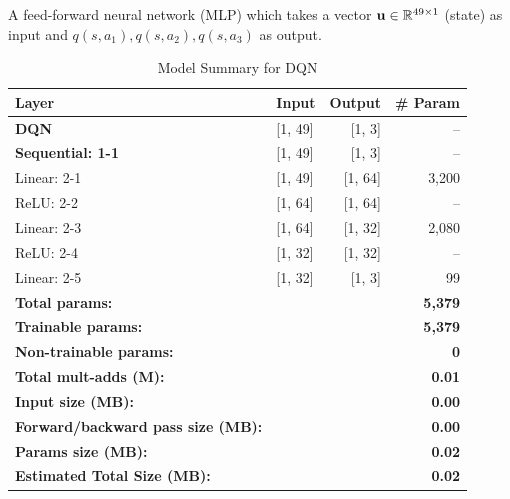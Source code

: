 A feed-forward neural network (MLP) which takes a vector $\mathbf{u}\in\mathbb{R}^{49\times1}$ (state) as input and $q(s,a_1), q(s,a_2),q(s,a_3)$ as output.
\begin{table}
	\centering
	\begin{adjustbox}{max width=\linewidth}
		\begin{tabular}{@{}llrr@{}}
			\toprule
			\textbf{Layer} & \textbf{Input} & \textbf{Output} & \textbf{\# Param} \\
			\midrule
			\textbf{DQN}                     & {[1, 49]}           & {[1, 3]}              & --                           \\
			\quad \textbf{Sequential: 1-1}   & {[1, 49]}           & {[1, 3]}              & --                           \\
			\quad \quad Linear: 2-1          & {[1, 49]}           & {[1, 64]}             & 3,200                        \\
			\quad \quad ReLU: 2-2            & {[1, 64]}           & {[1, 64]}             & --                           \\
			\quad \quad Linear: 2-3          & {[1, 64]}           & {[1, 32]}             & 2,080                        \\
			\quad \quad ReLU: 2-4            & {[1, 32]}           & {[1, 32]}             & --                           \\
			\quad \quad Linear: 2-5          & {[1, 32]}           & {[1, 3]}              & 99                           \\
			\midrule
			\textbf{Total params:}           &                     &                      & \textbf{5,379}                 \\
			\textbf{Trainable params:}       &                     &                      & \textbf{5,379}                 \\
			\textbf{Non-trainable params:}   &                     &                      & \textbf{0}                     \\
			\textbf{Total mult-adds (M):}    &                     &                      & \textbf{0.01}                  \\
			\midrule
			\textbf{Input size (MB):}        &                     &                      & \textbf{0.00}                  \\
			\textbf{Forward/backward pass size (MB):} &            &                      & \textbf{0.00}                  \\
			\textbf{Params size (MB):}       &                     &                      & \textbf{0.02}                  \\
			\textbf{Estimated Total Size (MB):} &                   &                      & \textbf{0.02}                  \\
			\bottomrule
		\end{tabular}
	\end{adjustbox}
	\caption{Model Summary for DQN}
	\label{tab:dqn}
\end{table}
